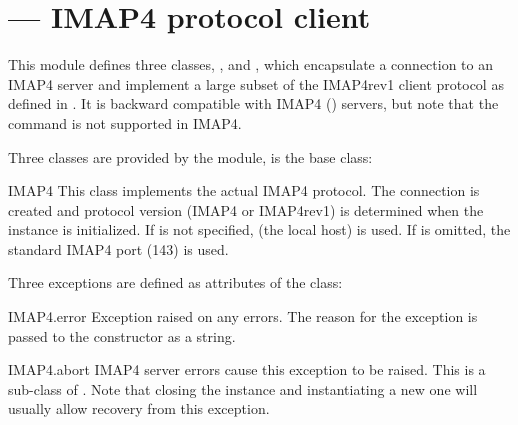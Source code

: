 \section{ ---
         IMAP4 protocol client}




This module defines three classes, , 
and , which encapsulate a
connection to an IMAP4 server and implement a large subset of the
IMAP4rev1 client protocol as defined in . It is backward
compatible with IMAP4 () servers, but note that the
 command is not supported in IMAP4.

Three classes are provided by the  module,
 is the base class:

\begin{classdesc}{IMAP4}{}
This class implements the actual IMAP4 protocol.  The connection is
created and protocol version (IMAP4 or IMAP4rev1) is determined when
the instance is initialized.
If  is not specified,  (the local host) is used.
If  is omitted, the standard IMAP4 port (143) is used.
\end{classdesc}

Three exceptions are defined as attributes of the  class:

\begin{excdesc}{IMAP4.error}
Exception raised on any errors.  The reason for the exception is
passed to the constructor as a string.
\end{excdesc}

\begin{excdesc}{IMAP4.abort}
IMAP4 server errors cause this exception to be raised.  This is a
sub-class of .  Note that closing the instance
and instantiating a new one will usually allow recovery from this
exception.
\end{excdesc}

